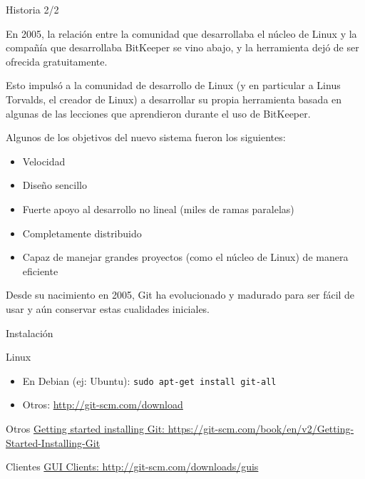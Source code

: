 \documentclass{beamer}
\begin{document}
\begin{frame}{Historia 2/2}

    En 2005, la relación entre la comunidad que desarrollaba el núcleo de Linux y la compañía que desarrollaba
    BitKeeper se vino abajo, y la herramienta dejó de ser ofrecida gratuitamente.

    \vspace{0.5em}

    Esto impulsó a la comunidad de desarrollo de Linux (y en particular a Linus Torvalds, el creador de Linux) a desarrollar su propia herramienta
    basada en algunas de las lecciones que aprendieron durante el uso de BitKeeper.

    \vspace{0.5em}

    Algunos de los objetivos del nuevo sistema fueron los siguientes:

    \begin{itemize}
        \item Velocidad
        \item Diseño sencillo
        \item Fuerte apoyo al desarrollo no lineal (miles de ramas paralelas)
        \item Completamente distribuido
        \item Capaz de manejar grandes proyectos (como el núcleo de Linux) de manera eficiente
    \end{itemize}

    \vspace{0.5em}

    Desde su nacimiento en 2005, Git ha evolucionado y madurado para ser fácil de usar y aún conservar estas cualidades iniciales.

\end{frame}

\begin{frame}{Instalación}

    \begin{block}{Linux}
        \begin{itemize}
            \item En Debian (ej: Ubuntu): \texttt{sudo apt-get install git-all}
            \item Otros: \url{http://git-scm.com/download}
        \end{itemize}
    \end{block}

    \begin{block}{Otros}
        \href{https://git-scm.com/book/en/v2/Getting-Started-Installing-Git}
        {Getting started installing Git: https://git-scm.com/book/en/v2/Getting-Started-Installing-Git}
    \end{block}

    \begin{block}{Clientes}
        \href{http://git-scm.com/downloads/guis}
        {GUI Clients: http://git-scm.com/downloads/guis}
    \end{block}

\end{frame}
\end{document}

